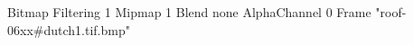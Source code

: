 {Bitmap
	{Filtering 1}
	{Mipmap 1}
	{Blend none}
	{AlphaChannel 0}
	{Frame "roof-06xx#dutch1.tif.bmp"}
}
